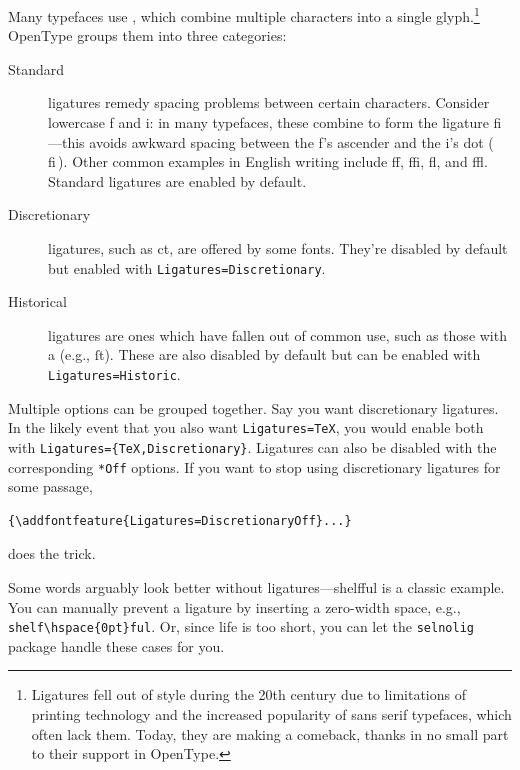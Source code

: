 Many typefaces use , which combine multiple characters
into a single glyph.\punckern\footnote{Ligatures fell out
of style during the 20{th}
century due to limitations of printing technology and the increased popularity
of sans serif typefaces, which often lack them.
Today, they are making a comeback,
thanks in no small part to their support in OpenType.}
OpenType groups them into three categories:
\begin{description}
\item[Standard] ligatures remedy spacing problems between certain characters.
    Consider lowercase f and i: in many typefaces,
    these combine to form the ligature fi---this avoids
    awkward spacing between the f's ascender and the i's dot
    { (\,fi\,)}.
    Other common examples in English writing include ff,
    ffi, fl, and ffl.
    Standard ligatures are enabled by default.
\item[Discretionary] ligatures, such as
    {ct},
    are offered by some fonts.
    They're disabled by default but enabled with
    \verb|Ligatures=Discretionary|.
\item[Historical] ligatures are ones which have fallen out of common use,
    such as those with a  (e.g., ſt).
    These are also disabled by default
    but can be enabled with \verb|Ligatures=Historic|.
\end{description}
Multiple options can be grouped together.
Say you want discretionary ligatures.
In the likely event that you also want \verb|Ligatures=TeX|,
you would enable both with
\verb|Ligatures={TeX,Discretionary}|.
Ligatures can also be disabled with the corresponding \verb|*Off|
options. If you want to stop using discretionary ligatures for some passage,
\begin{leftfigure}
\begin{lstlisting}
{\addfontfeature{Ligatures=DiscretionaryOff}...}
\end{lstlisting}
\end{leftfigure}
does the trick.

Some words arguably look better without ligatures---\mbox{shelfful}
is a classic example.\punckern{}
You can manually prevent a ligature by inserting a zero-width space, e.g.,
\verb|shelf\hspace{0pt}ful|.
Or, since life is too short, you can let the \texttt{selnolig} package
handle these cases for you.

